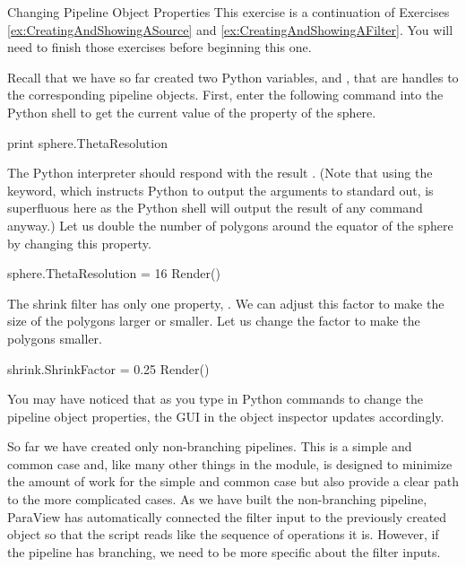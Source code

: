 \begin{exercise}{Changing Pipeline Object Properties}
  \label{ex:ChangingPipelineObjectProperties}%
  This exercise is a continuation of Exercises
  \ref{ex:CreatingAndShowingASource} and
  \ref{ex:CreatingAndShowingAFilter}.  You will need to finish those
  exercises before beginning this one.

  Recall that we have so far created two Python variables, 
  and , that are handles to the corresponding pipeline
  objects.  First, enter the following command into the Python shell to get
  the current value of the  property of the sphere.

  \begin{python}
print sphere.ThetaResolution
  \end{python}

  The Python interpreter should respond with the result .  (Note
  that using the  keyword, which instructs Python to output
  the arguments to standard out, is superfluous here as the Python shell
  will output the result of any command anyway.)  Let us double the number
  of polygons around the equator of the sphere by changing this property.

  \begin{python}
sphere.ThetaResolution = 16
Render()
  \end{python}

  The shrink filter has only one property, .  We can
  adjust this factor to make the size of the polygons larger or smaller.
  Let us change the factor to make the polygons smaller.

  \begin{python}
shrink.ShrinkFactor = 0.25
Render()
  \end{python}

  You may have noticed that as you type in Python commands to change the
  pipeline object properties, the GUI in the object inspector updates
  accordingly.
\end{exercise}

So far we have created only non-branching pipelines.  This is a simple and
common case and, like many other things in the 
module, is designed to minimize the amount of work for the simple and
common case but also provide a clear path to the more complicated cases.
As we have built the non-branching pipeline, ParaView has automatically
connected the filter input to the previously created object so that the
script reads like the sequence of operations it is.  However, if the
pipeline has branching, we need to be more specific about the filter
inputs.

